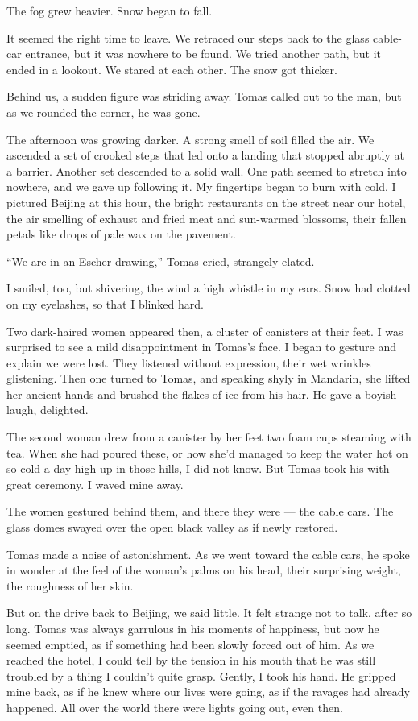 The fog grew heavier. Snow began to fall.

It seemed the right time to leave. We retraced our steps back to the
glass cable-car entrance, but it was nowhere to be found. We tried
another path, but it ended in a lookout. We stared at each other. The
snow got thicker.

Behind us, a sudden figure was striding away. Tomas called out to the
man, but as we rounded the corner, he was gone.

The afternoon was growing darker. A strong smell of soil filled the air.
We ascended a set of crooked steps that led onto a landing that stopped
abruptly at a barrier. Another set descended to a solid wall. One path
seemed to stretch into nowhere, and we gave up following it. My
fingertips began to burn with cold. I pictured Beijing at this hour, the
bright restaurants on the street near our hotel, the air smelling of
exhaust and fried meat and sun-warmed blossoms, their fallen petals like
drops of pale wax on the pavement.

``We are in an Escher drawing,'' Tomas cried, strangely elated.

I smiled, too, but shivering, the wind a high whistle in my ears. Snow
had clotted on my eyelashes, so that I blinked hard.

Two dark-haired women appeared then, a cluster of canisters at their
feet. I was surprised to see a mild disappointment in Tomas's face. I
began to gesture and explain we were lost. They listened without
expression, their wet wrinkles glistening. Then one turned to Tomas, and
speaking shyly in Mandarin, she lifted her ancient hands and brushed the
flakes of ice from his hair. He gave a boyish laugh, delighted.

The second woman drew from a canister by her feet two foam cups steaming
with tea. When she had poured these, or how she'd managed to keep the
water hot on so cold a day high up in those hills, I did not know. But
Tomas took his with great ceremony. I waved mine away.

The women gestured behind them, and there they were --- the cable cars.
The glass domes swayed over the open black valley as if newly restored.

Tomas made a noise of astonishment. As we went toward the cable cars, he
spoke in wonder at the feel of the woman's palms on his head, their
surprising weight, the roughness of her skin.

But on the drive back to Beijing, we said little. It felt strange not to
talk, after so long. Tomas was always garrulous in his moments of
happiness, but now he seemed emptied, as if something had been slowly
forced out of him. As we reached the hotel, I could tell by the tension
in his mouth that he was still troubled by a thing I couldn't quite
grasp. Gently, I took his hand. He gripped mine back, as if he knew
where our lives were going, as if the ravages had already happened. All
over the world there were lights going out, even then.

